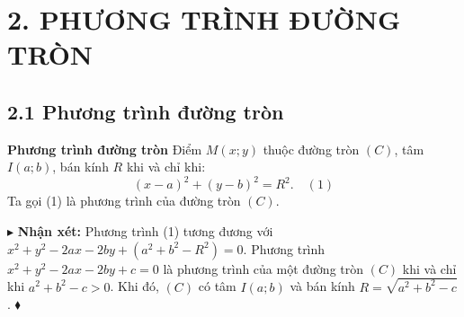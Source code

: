 \documentclass[12pt,a4paper]{extarticle}
\begin{document}
\section*{\textcolor{book}{2. PHƯƠNG TRÌNH ĐƯỜNG TRÒN}}
\subsection*{\textcolor{book}{2.1 Phương trình đường tròn}}
\begin{minipage}{0.65\textwidth}
\textcolor{book}{\textbf{Phương trình đường tròn}}
Điểm $M(x; y)$ thuộc đường tròn $(C)$, tâm $I(a; b)$, bán kính $R$ khi và chỉ khi:
\[
(x - a)^2 + (y - b)^2 = R^2. \quad (1)
\]
Ta gọi (1) là phương trình của đường tròn $(C)$.
\end{minipage}
\hfill
\begin{minipage}{0.3\textwidth}
\centering
{}
\end{minipage}
\vspace{0.3cm}
\textcolor{book}{$\blacktriangleright$} \textbf{Nhận xét:} Phương trình (1) tương đương với $x^2 + y^2 - 2ax - 2by + (a^2 + b^2 - R^2) = 0$.
\vspace{0.3cm}
Phương trình $x^2 + y^2 - 2ax - 2by + c = 0$ là phương trình của một đường tròn $(C)$ khi và chỉ khi $a^2 + b^2 - c > 0$. Khi đó, $(C)$ có tâm $I(a; b)$ và bán kính $R = \sqrt{a^2 + b^2 - c}$.
\vspace{0.3cm}
\textcolor{book}{$\blacklozenge$} 
\vspace{0.4cm}
\end{document}
